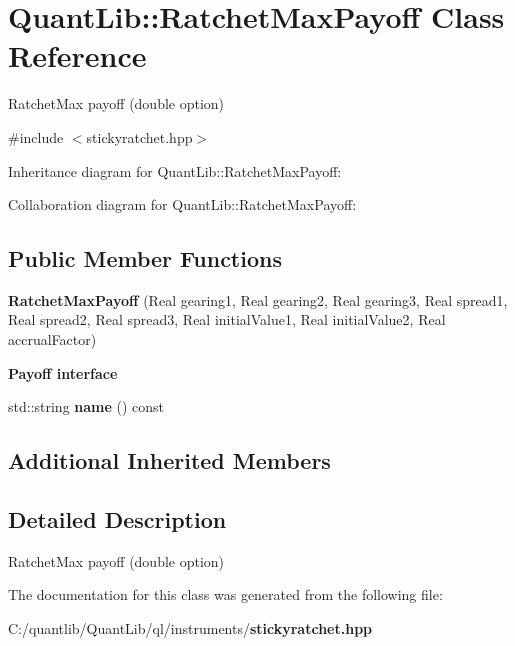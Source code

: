 \section{Quant\+Lib\+:\+:Ratchet\+Max\+Payoff Class Reference}
\label{class_quant_lib_1_1_ratchet_max_payoff}


Ratchet\+Max payoff (double option)  




{\ttfamily \#include $<$stickyratchet.\+hpp$>$}



Inheritance diagram for Quant\+Lib\+:\+:Ratchet\+Max\+Payoff\+:


Collaboration diagram for Quant\+Lib\+:\+:Ratchet\+Max\+Payoff\+:
\subsection*{Public Member Functions}
\begin{DoxyCompactItemize}
\item 
{\bfseries Ratchet\+Max\+Payoff} (Real gearing1, Real gearing2, Real gearing3, Real spread1, Real spread2, Real spread3, Real initial\+Value1, Real initial\+Value2, Real accrual\+Factor)\label{class_quant_lib_1_1_ratchet_max_payoff_a428352c3221076a7a1d600bb2f5d44e7}

\end{DoxyCompactItemize}
\begin{Indent}{\bf Payoff interface}\par
\begin{DoxyCompactItemize}
\item 
std\+::string {\bfseries name} () const \label{class_quant_lib_1_1_ratchet_max_payoff_a490f4ff3ae766c320d9d0c1d410eb3fe}

\end{DoxyCompactItemize}
\end{Indent}
\subsection*{Additional Inherited Members}


\subsection{Detailed Description}
Ratchet\+Max payoff (double option) 

The documentation for this class was generated from the following file\+:\begin{DoxyCompactItemize}
\item 
C\+:/quantlib/\+Quant\+Lib/ql/instruments/{\bf stickyratchet.\+hpp}\end{DoxyCompactItemize}
